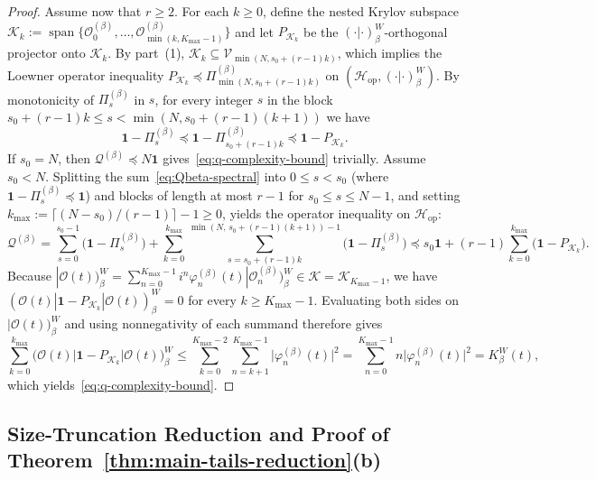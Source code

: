 \documentclass[11pt,a4paper]{article}
\numberwithin{equation}{section}
\theoremstyle{plain}
\theoremstyle{definition}
\newcommand{\Hop}{\mathcal{H}_{\mathrm{op}}}
\begin{document}
\begin{proof}
Assume now that $r\ge 2$. For each $k\ge 0$, define the nested Krylov subspace $\mathcal{K}_k := \operatorname{span}\{\mathcal{O}_0^{(\beta)},\dots,\mathcal{O}_{\min(k,K_{\max}-1)}^{(\beta)}\}$ and let $P_{\mathcal{K}_k}$ be the $(\cdot|\cdot)_\beta^W$-orthogonal projector onto $\mathcal{K}_k$. By part~(1), $\mathcal{K}_k\subseteq\mathcal{V}_{\min(N,s_0+(r-1)k)}$, which implies the Loewner operator inequality $P_{\mathcal{K}_k}\preceq \Pi_{\min(N,s_0+(r-1)k)}^{(\beta)}$ on $(\Hop,(\cdot|\cdot)_\beta^W)$. By monotonicity of $\Pi_s^{(\beta)}$ in $s$, for every integer $s$ in the block $s_0+(r-1)k \le s < \min(N, s_0+(r-1)(k+1))$ we have
\[
  \mathbf{1}-\Pi_s^{(\beta)} \preceq \mathbf{1}-\Pi_{s_0+(r-1)k}^{(\beta)} \preceq \mathbf{1}-P_{\mathcal{K}_k}.
\]
If $s_0 = N$, then $\mathcal{Q}^{(\beta)}\preceq N\mathbf{1}$ gives~\eqref{eq:q-complexity-bound} trivially. Assume $s_0 < N$. Splitting the sum~\eqref{eq:Qbeta-spectral} into $0\le s < s_0$ (where $\mathbf{1}-\Pi_s^{(\beta)}\preceq\mathbf{1}$) and blocks of length at most $r-1$ for $s_0\le s\le N-1$, and setting $k_{\max} := \lceil (N-s_0)/(r-1)\rceil - 1 \ge 0$, yields the operator inequality on $\Hop$:
\[
  \mathcal{Q}^{(\beta)}
  = \sum_{s=0}^{s_0-1}\bigl(\mathbf{1}-\Pi_s^{(\beta)}\bigr)
    + \sum_{k=0}^{k_{\max}}\sum_{s=s_0+(r-1)k}^{\min(N,\,s_0+(r-1)(k+1))-1}\bigl(\mathbf{1}-\Pi_s^{(\beta)}\bigr)
  \preceq s_0\mathbf{1} + (r-1)\sum_{k=0}^{k_{\max}}\bigl(\mathbf{1}-P_{\mathcal{K}_k}\bigr).
\]
Because $|\mathcal{O}(t))_\beta^W = \sum_{n=0}^{K_{\max}-1} i^n\varphi_n^{(\beta)}(t)|\mathcal{O}_n^{(\beta)})_\beta^W \in \mathcal{K} = \mathcal{K}_{K_{\max}-1}$, we have $(\mathcal{O}(t)|\mathbf{1}-P_{\mathcal{K}_k}|\mathcal{O}(t))_\beta^W = 0$ for every $k\ge K_{\max}-1$. Evaluating both sides on $|\mathcal{O}(t))_\beta^W$ and using nonnegativity of each summand therefore gives
\[
  \sum_{k=0}^{k_{\max}}\bigl(\mathcal{O}(t)\big|\mathbf{1}-P_{\mathcal{K}_k}\big|\mathcal{O}(t)\bigr)_\beta^W
  \le \sum_{k=0}^{K_{\max}-2}\sum_{n=k+1}^{K_{\max}-1}\bigl|\varphi_n^{(\beta)}(t)\bigr|^2
  = \sum_{n=0}^{K_{\max}-1} n\bigl|\varphi_n^{(\beta)}(t)\bigr|^2
  = K_\beta^W(t),
\]
which yields~\eqref{eq:q-complexity-bound}.
\end{proof}

\subsection{Size-Truncation Reduction and Proof of Theorem~\ref{thm:main-tails-reduction}(b)}\label{subsec:static-reduction}
\end{document}

